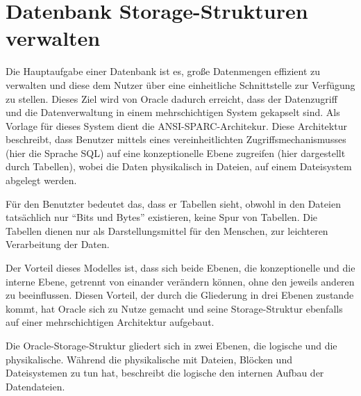 \chapter{Datenbank Storage-Strukturen verwalten}
\chaptertoc{}
\cleardoubleevenpage

      Die Hauptaufgabe einer Datenbank ist es, große Datenmengen effizient
      zu verwalten und diese dem Nutzer über eine einheitliche Schnittstelle
      zur Verfügung zu stellen. Dieses Ziel wird von Oracle dadurch erreicht,
      dass der Datenzugriff und die Datenverwaltung in einem mehrschichtigen
      System gekapselt sind. Als Vorlage für dieses System dient die
      ANSI-SPARC-Architekur.
      Diese Architektur beschreibt, dass Benutzer mittels eines
      vereinheitlichten Zugriffsmechanismusses (hier die Sprache SQL) auf eine
      konzeptionelle Ebene zugreifen (hier dargestellt durch Tabellen), wobei
      die Daten physikalisch in Dateien, auf einem Dateisystem abgelegt werden.

      Für den Benutzter bedeutet das, dass er Tabellen sieht, obwohl in den Dateien tatsächlich nur \enquote{Bits und Bytes} existieren, keine Spur von Tabellen. Die Tabellen dienen nur als Darstellungsmittel für den Menschen, zur leichteren Verarbeitung der Daten.

      Der Vorteil dieses Modelles ist, dass sich beide Ebenen, die konzeptionelle und die interne Ebene, getrennt von einander verändern können, ohne den jeweils anderen zu beeinflussen. Diesen Vorteil, der durch die Gliederung in drei Ebenen zustande kommt, hat Oracle sich zu Nutze gemacht und seine Storage-Struktur ebenfalls auf einer mehrschichtigen Architektur aufgebaut.

      Die Oracle-Storage-Struktur gliedert sich in zwei Ebenen, die logische und die physikalische. Während die physikalische mit Dateien, Blöcken und Dateisystemen zu tun hat, beschreibt die logische den internen Aufbau der Datendateien.

